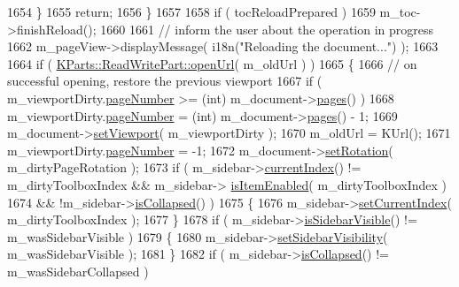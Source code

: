 \begin{DoxyCode}
1654         \}
1655         \textcolor{keywordflow}{return};
1656     \}
1657     
1658     \textcolor{keywordflow}{if} ( tocReloadPrepared )
1659         m\_toc->finishReload();
1660 
1661     \textcolor{comment}{// inform the user about the operation in progress}
1662     m\_pageView->displayMessage( i18n(\textcolor{stringliteral}{"Reloading the document..."}) );
1663 
1664     \textcolor{keywordflow}{if} ( \hyperlink{classKParts_1_1ReadOnlyPart_a1ff41b28f8da57ccc380e0c092a50c0c}{KParts::ReadWritePart::openUrl}( m\_oldUrl ) )
1665     \{
1666         \textcolor{comment}{// on successful opening, restore the previous viewport}
1667         \textcolor{keywordflow}{if} ( m\_viewportDirty.\hyperlink{classOkular_1_1DocumentViewport_a122674d4a493e79b1aa5fd5c00e81c93}{pageNumber} >= (\textcolor{keywordtype}{int}) m\_document->\hyperlink{classOkular_1_1Document_aaf5d986758e25127946986abaa401bcd}{pages}() )
1668             m\_viewportDirty.\hyperlink{classOkular_1_1DocumentViewport_a122674d4a493e79b1aa5fd5c00e81c93}{pageNumber} = (\textcolor{keywordtype}{int}) m\_document->\hyperlink{classOkular_1_1Document_aaf5d986758e25127946986abaa401bcd}{pages}() - 1;
1669         m\_document->\hyperlink{classOkular_1_1Document_a1afaf8b8b5cb1e715949024fb75bb767}{setViewport}( m\_viewportDirty );
1670         m\_oldUrl = KUrl();
1671         m\_viewportDirty.\hyperlink{classOkular_1_1DocumentViewport_a122674d4a493e79b1aa5fd5c00e81c93}{pageNumber} = -1;
1672         m\_document->\hyperlink{classOkular_1_1Document_a2f2f1091749143d82fd30f1d3d6cef87}{setRotation}( m\_dirtyPageRotation );
1673         \textcolor{keywordflow}{if} ( m\_sidebar->\hyperlink{classSidebar_a87085cfe9098de2cd21dff4f13f4df5a}{currentIndex}() != m\_dirtyToolboxIndex && m\_sidebar->
      \hyperlink{classSidebar_af8daf68e83b592177a830b7ec35de3db}{isItemEnabled}( m\_dirtyToolboxIndex )
1674             && !m\_sidebar->\hyperlink{classSidebar_a7faa5e2df81f4fc935dfc85cead3efe6}{isCollapsed}() )
1675         \{
1676             m\_sidebar->\hyperlink{classSidebar_a2e8f04dcf175f5d4dc5b6961a417611e}{setCurrentIndex}( m\_dirtyToolboxIndex );
1677         \}
1678         \textcolor{keywordflow}{if} ( m\_sidebar->\hyperlink{classSidebar_af919caad848a5f5079b275bdd4666409}{isSidebarVisible}() != m\_wasSidebarVisible )
1679         \{
1680             m\_sidebar->\hyperlink{classSidebar_acab620fd1f317c5c40c5f5b162dfa77d}{setSidebarVisibility}( m\_wasSidebarVisible );
1681         \}
1682         \textcolor{keywordflow}{if} ( m\_sidebar->\hyperlink{classSidebar_a7faa5e2df81f4fc935dfc85cead3efe6}{isCollapsed}() != m\_wasSidebarCollapsed )

\end{DoxyCode}
